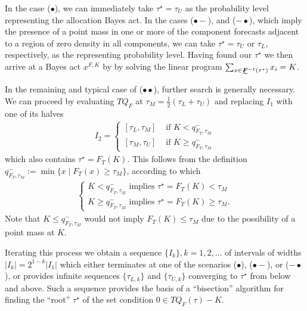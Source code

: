 \documentclass{article}
\begin{document}
In the case ($\bullet$), we can immediately take 
$\tau^{\star}=\tau_U$ as the probability level representing the allocation Bayes act.
In the cases
($\bullet\!-$), and ($-\!\bullet$), which imply the presence of a point mass in one or more of the 
component forecasts adjacent to a region of zero density in all components, we can take $\tau^{\star}=\tau_U$ or $\tau_L$, 
respectively, as the representing probability level.  
Having found our $\tau^{\star}$ we then arrive at a Bayes act $x^{F,K}$ by by solving the
linear program $\sum_{x \in \undertilde{\bm{F}}^{-1}(\tau^{\star})}x_i = K$.

In the remaining and typical case of ($\bullet \bullet$), further search is generally necessary. We can proceed 
by evaluating $TQ_F$ at $\tau_M = \frac{1}{2}\left(\tau_L + \tau_U\right)$ and replacing $I_1$ with one of its 
halves
\begin{align}
I_2 = 
\begin{cases}
[\tau_L, \tau_M] & \text{ if } K < q^{-}_{F_T,\tau_M} \\
[\tau_M, \tau_U] & \text{ if } K \geq q^{-}_{F_T,\tau_M}
\end{cases}
\end{align}
which also contains $\tau^{\star} = F_T(K)$. This follows from the definition $q^{-}_{F_T,\tau_M} := \min\{x \mid F_T(x) \geq \tau_M\}$, 
according to which
\begin{align}
\begin{cases}
K < q^{-}_{F_T,\tau_M} \text{ implies } \tau^{\star} = F_T(K) < \tau_M  \\
K \geq q^{-}_{F_T,\tau_M} \text{ implies } \tau^{\star} = F_T(K) \geq \tau_M.
\end{cases}
\end{align}
Note that $K \leq q^{-}_{F_T,\tau_M}$ would not imply $F_T(K) \leq \tau_M$ due to the possibility of a point mass at $K$.

Iterating this process we obtain a sequence $\{I_k\}, k=1,2,\ldots$ of intervals of widths 
$\left|I_k \right| = 2^{1-k}\left|I_1 \right|$ which either terminates at one of the scenarios 
($\bullet$), ($\bullet\!-$), or ($-\!\bullet$), or provides infinite sequences $\{\tau_{L,k}\}$ and $\{\tau_{U,k}\}$ converging
to $\tau^{\star}$ from below and above. Such a sequence provides the basis of a ``bisection'' algorithm for finding
the ``root'' $\tau^{\star}$ of the set condition $0 \in TQ_F(\tau) - K$.
\end{document}
